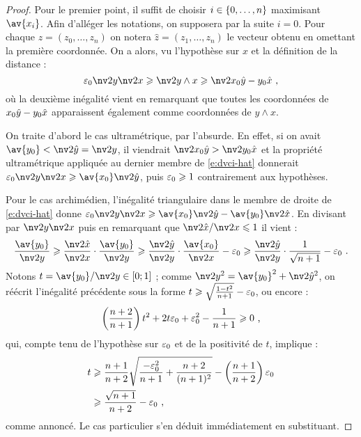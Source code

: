 \begin{proof}
  \newcommand*\hatxs {\smash{\hat x}}
  \newcommand*\hatys {\smash{\hat y}}
  Pour le premier point, il suffit de choisir \( i \in \lbrace 0, \dots, n \rbrace \)
  maximisant \( \av{x_i} \). Afin d'alléger les notations, on supposera par
  la suite \( i = 0 \). Pour chaque \( z = (z_0, \dots, z_n) \) on notera \(
    \hat{z} = (z_1, \dots, z_n) \) le vecteur obtenu en omettant la première
  coordonnée. On a alors, vu l'hypothèse sur \( x \) et la définition de la
  distance :
  \begin{equation} \label{e:dvci-hat}
    \eps_0 \nv2 y \nv2 x
    \ge
    \nv2{y \wedge x}
    \ge
    \nv2{x_0 \hatys - y_0 \hatxs}
    \pmm,
  \end{equation}
  où la deuxième inégalité vient en remarquant que toutes les coordonnées de
  \( x_0 \hatys - y_0 \hatxs \) apparaissent également comme coordonnées de \(
    y \wedge x \).

  On traite d'abord le cas ultramétrique, par l'absurde. En effet, si on avait
  \( \av{y_0} < \nv2{\hatys} = \nv2{y} \), il viendrait \( \nv2{x_0 \hatys} >
    \nv2{y_0 \hatxs} \) et la propriété ultramétrique appliquée au dernier
  membre de \eqref{e:dvci-hat} donnerait \( \eps_0 \nv2{y}\nv2{x}  \ge
    \av{x_0}\nv2{\hatys} \), puis \( \varepsilon_0 \geqslant 1 \) contrairement aux
  hypothèses.

  Pour le cas archimédien, l'inégalité triangulaire dans le membre de droite
  de \eqref{e:dvci-hat} donne
  \( \eps_0 \nv2{y}\nv2{x}  \ge \av{x_0}\nv2{\hatys} - \av{y_0}\nv2{\hatxs}
  \).  En divisant par \( \nv2{y}\nv2{x} \) puis en remarquant que \(
    \nv2{\hatxs}/\nv2{x} \le 1 \) il vient :
  \begin{align}
    \frac{\av{y_0}}{\nv2{y}}
    \ge
    \frac{\nv2{\hatxs}}{\nv2{x}}
    \cdot \frac{\av{y_0}}{\nv2{y}}
    \ge
    \frac{\nv2{\hatys}}{\nv2{y}}
    \cdot \frac{\av{x_0}}{\nv2{x}}
    - \eps_0
    \ge
    \frac{\nv2{\hatys}}{\nv2{y}}
    \cdot
    \frac{1}{\sqrt{n+1}}
    - \eps_0
    \pmm.
  \end{align}
  Notons \( t = \av{y_0}/\nv2{y} \in [0; 1] \) ; comme \( \nv2{y}^2 =
    \av{y_0}^2 + \nv2{\hatys}^2 \), on réécrit l'inégalité précédente sous
  la forme \( t \geqslant \sqrt{\frac{1-t^2}{n+1}}-\varepsilon_0 \), ou encore :
  \begin{equation}
    \left( \frac{n+2}{n+1} \right) t^2
    + 2t\varepsilon_0
    + \varepsilon_0^2
    - \frac{1}{n+1}
    \geqslant
    0
    \text{ ,}
  \end{equation}
  qui, compte tenu de l'hypothèse sur \( \varepsilon_0 \) et de la positivité de \( t
  \), implique :
  \begin{align*}
    t
    & \geqslant
    \frac{n+1}{n+2}
    \sqrt{ \frac{-\varepsilon_0^2}{n+1}+\frac{n+2}{(n+1)^2} }
    - \left( \frac{n+1}{n+2} \right) \varepsilon_0
    \\ & \geqslant
    \frac{\sqrt{n+1}}{n+2} - \varepsilon_0
    \text{ ,}
  \end{align*}
  comme annoncé. Le cas particulier s'en déduit immédiatement en substituant.
\end{proof}

